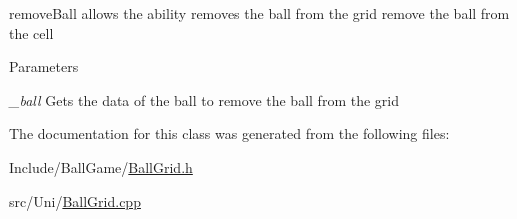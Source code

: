 removeBall allows the ability removes the ball from the grid remove the ball from the cell


\begin{DoxyParams}{Parameters}
\item[{\em \_\-ball}]Gets the data of the ball to remove the ball from the grid \end{DoxyParams}


The documentation for this class was generated from the following files:\begin{DoxyCompactItemize}
\item 
Include/BallGame/\hyperlink{BallGrid_8h}{BallGrid.h}\item 
src/Uni/\hyperlink{BallGrid_8cpp}{BallGrid.cpp}\end{DoxyCompactItemize}
